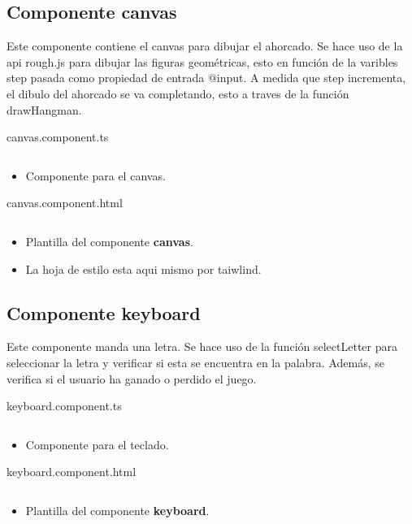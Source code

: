 \documentclass{article}
\newenvironment{block}{\captionsetup{type=listing}}{}
\begin{document}
\subsection{Componente canvas}
Este componente contiene el canvas para dibujar el ahorcado. Se hace uso de la api rough.js para dibujar las figuras geométricas, esto en función de la varibles step pasada como propiedad de entrada @input. A medida que step incrementa, el dibulo del ahorcado se va completando, esto a traves de la función drawHangman.


\begin{block}
	\caption{canvas.component.ts}
	\inputminted{TypeScript}{../hangMan/src/app/canvas/canvas.component.ts}
	\begin{itemize}
		\item Componente para el canvas.
	\end{itemize}

	\caption{canvas.component.html}
	\inputminted{HTML}{../hangMan/src/app/canvas/canvas.component.html}
	\begin{itemize}
		\item Plantilla del componente \textbf{canvas}.
		\item La hoja de estilo esta aqui mismo por taiwlind.
	\end{itemize}
\end{block}
\pagebreak

\subsection{Componente keyboard}
Este componente manda una letra. Se hace uso de la función selectLetter para seleccionar la letra y verificar si esta se encuentra en la palabra. Además, se verifica si el usuario ha ganado o perdido el juego.
\begin{block}
	\caption{keyboard.component.ts}
	\inputminted{TypeScript}{../hangMan/src/app/keyboard/keyboard.component.ts}
	\begin{itemize}
		\item Componente para el teclado.
	\end{itemize}

	\caption{keyboard.component.html}
	\inputminted{HTML}{../hangMan/src/app/keyboard/keyboard.component.html}
	\begin{itemize}
		\item Plantilla del componente \textbf{keyboard}.
	\end{itemize}

\end{block}
\end{document}
